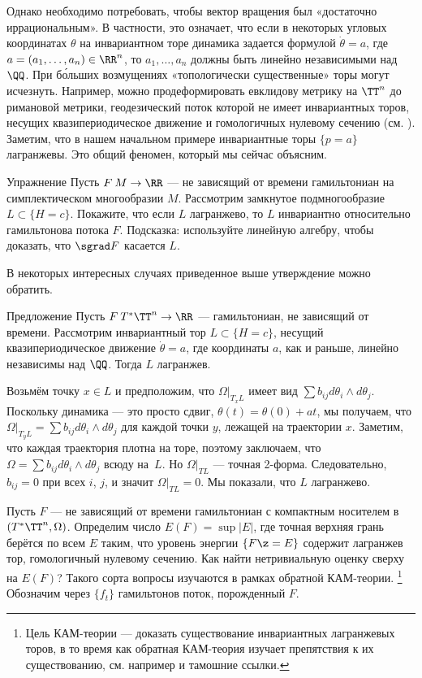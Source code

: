 Однако необходимо потребовать, чтобы вектор вращения был «достаточно иррациональным».
В частности, это означает, что если в некоторых угловых координатах $\theta$ на инвариантном торе динамика задается формулой $\dot\theta = a$, где $a = (a_1 ,\dots, a_n) \in \RR^n$, то $a_1 ,\dots, a_n$ должны быть линейно независимыми над $\QQ$.
При б\'{о}льших возмущениях «топологически существенные» торы могут исчезнуть.
Например, можно продеформировать евклидову метрику на $\TT^n$ до римановой метрики, геодезический поток которой не имеет инвариантных торов, несущих квазипериодическое движение и гомологичных нулевому сечению (см. \cite{AL}).
Заметим, что в нашем начальном примере инвариантные торы $\{p = a\}$ лагранжевы.
Это общий феномен, который мы сейчас объясним.

\begin{thm}{Упражнение}\label{8.1.А}
Пусть $F\: M \to \RR$ --- не зависящий от времени гамильтониан на симплектическом многообразии $M$.
Рассмотрим замкнутое подмногообразие $L \subset \{H = c\}$.
Покажите, что если $L$ лагранжево, то $L$ инвариантно относительно гамильтонова потока $F$.
Подсказка: используйте линейную алгебру, чтобы доказать, что $\sgrad F$ касается $L$.
\end{thm}

В некоторых интересных случаях приведенное выше утверждение можно обратить.

\begin{thm}[(\cite{He})]{Предложение}\label{8.1.B}
Пусть $F\: T^\ast \TT^n \to \RR$ --- гамильтониан, не зависящий от времени.
Рассмотрим инвариантный тор $L \subset \{H = c\}$, несущий
квазипериодическое движение $\dot\theta = a$, где координаты $a$, как и раньше, линейно независимы над $\QQ$.
Тогда $L$ лагранжев.
\end{thm}

Возьмём точку $x \in L$ и предположим, что $\Omega|_{T_x L}$ имеет вид $\sum b_{ij} d\theta_i \wedge d\theta_j$.
Поскольку динамика --- это просто сдвиг, $\theta (t) = \theta (0) + at$, мы получаем, что $\Omega|_{T_y L} = \sum b_{ij} d\theta_i \wedge d\theta_j$ для каждой точки $y$, лежащей на траектории $x$.
Заметим, что каждая траектория плотна на торе, поэтому заключаем, что $\Omega = \sum b_{ij} d\theta_i \wedge d\theta_j$ всюду на~$L$.
Но $\Omega|_{TL}$ --- точная 2-форма.
Следовательно, $b_{ij} = 0$ при всех $i$, $j$, и значит $\Omega|_{T L} = 0$. 
Мы показали, что $L$ лагранжево.
\qeds

Пусть $F$ --- не зависящий от времени гамильтониан с компактным носителем в $(T^\ast \TT^n, \Omega)$.
Определим число $E (F) = \sup | E |$, где точная верхняя грань берётся по всем $E$ таким, что уровень энергии $\{F \z= E\}$ содержит лагранжев тор, гомологичный нулевому сечению.
Как найти нетривиальную оценку сверху на $E (F)$?
Такого сорта вопросы изучаются в рамках обратной КАМ-теории.%
\footnote{Цель КАМ-теории --- доказать существование инвариантных лагранжевых торов, в то время как обратная КАМ-теория изучает препятствия к их существованию, см. например \cite{Mac} и тамошние ссылки.}
Обозначим через $\{f_t\}$ гамильтонов поток, порожденный $F$.

